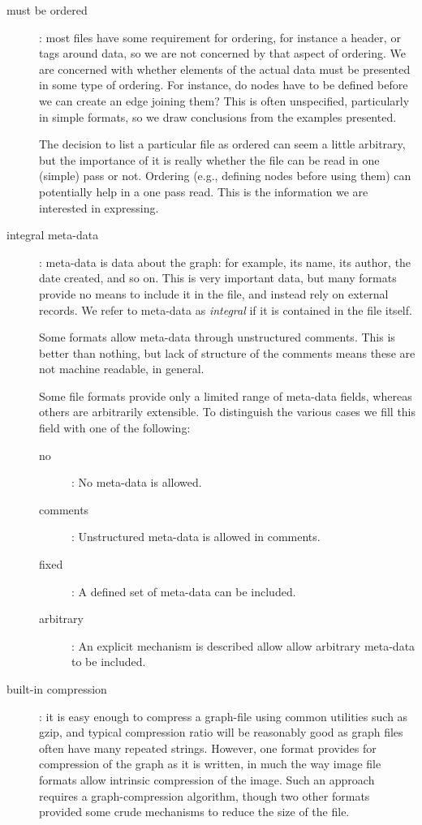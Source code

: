\documentclass{sig-alternate}
\begin{document}
\begin{description}
\item[must be ordered]: most files have some requirement for ordering,
  for instance a header, or tags around data, so we are not concerned
  by that aspect of ordering. We are concerned with whether elements
  of the actual data must be presented in some type of ordering. For
  instance, do nodes have to be defined before we can create an edge
  joining them? This is often unspecified, particularly in simple
  formats, so we draw conclusions from the examples presented. 

  The decision to list a particular file as ordered can seem a little
  arbitrary, but the importance of it is really whether the file can
  be read in one (simple) pass or not. Ordering (e.g., defining nodes
  before using them) can potentially help in a one pass read. This is
  the information we are interested in expressing.

\item[integral meta-data]: meta-data is data about the graph: for
  example, its name, its author, the date created, and so on. This is
  very important data, but many formats provide no means to include it
  in the file, and instead rely on external records. We refer to
  meta-data as {\em integral} if it is contained in the file itself.  

  Some formats allow meta-data through unstructured comments. This is
  better than nothing, but lack of structure of the comments means
  these are not machine readable, in general.

  Some file formats provide only a limited range of meta-data fields,
  whereas others are arbitrarily extensible. To distinguish the
  various cases we fill this field with one of the following:
  \begin{description}
  \item[no]: No meta-data is allowed.
  \item[comments]: Unstructured meta-data is allowed in comments.
  \item[fixed]: A defined set of meta-data can be included.
  \item[arbitrary]: An explicit mechanism is described allow allow
    arbitrary meta-data to be included.
  \end{description}

\item[built-in compression]: it is easy enough to compress a graph-file
  using common utilities such as gzip, and typical compression ratio
  will be reasonably good as graph files often have many repeated
  strings. However, one format provides for compression of the graph
  as it is written, in much the way image file formats allow intrinsic
  compression of the image. Such an approach requires a
  graph-compression algorithm, though two other formats provided some
  crude mechanisms to reduce the size of the file.


\end{description}
\end{document}
